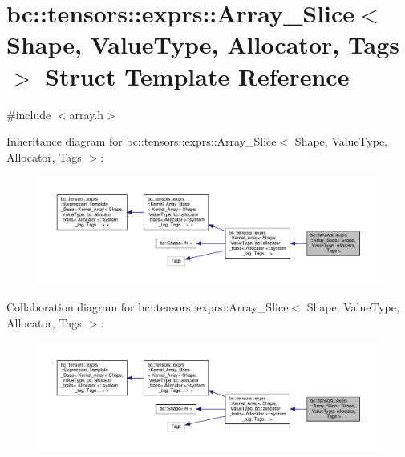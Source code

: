 \hypertarget{classbc_1_1tensors_1_1exprs_1_1Array__Slice}{}\section{bc\+:\+:tensors\+:\+:exprs\+:\+:Array\+\_\+\+Slice$<$ Shape, Value\+Type, Allocator, Tags $>$ Struct Template Reference}
\label{classbc_1_1tensors_1_1exprs_1_1Array__Slice}


{\ttfamily \#include $<$array.\+h$>$}



Inheritance diagram for bc\+:\+:tensors\+:\+:exprs\+:\+:Array\+\_\+\+Slice$<$ Shape, Value\+Type, Allocator, Tags $>$\+:\nopagebreak
\begin{figure}[H]
\begin{center}
\leavevmode
\includegraphics[width=350pt]{classbc_1_1tensors_1_1exprs_1_1Array__Slice__inherit__graph}
\end{center}
\end{figure}


Collaboration diagram for bc\+:\+:tensors\+:\+:exprs\+:\+:Array\+\_\+\+Slice$<$ Shape, Value\+Type, Allocator, Tags $>$\+:\nopagebreak
\begin{figure}[H]
\begin{center}
\leavevmode
\includegraphics[width=350pt]{classbc_1_1tensors_1_1exprs_1_1Array__Slice__coll__graph}
\end{center}
\end{figure}
